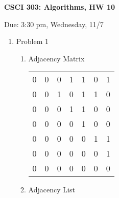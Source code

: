 \documentclass[11pt]{article}
\begin{document}
\begin{LARGE}
\centerline {\bf CSCI 303: Algorithms, HW 10}
\end{LARGE}
\vskip 0.25cm
\centerline{Due: 3:30 pm, Wednesday, 11/7}

\begin{enumerate}
\item Problem 1\\
\begin{enumerate}
\item Adjacency Matrix
\begin{tabular}{ccccccc}
0&0&0&1&1&0&1\\
0&0&1&0&1&1&0\\
0&0&0&1&1&0&0\\
0&0&0&0&1&0&0\\
0&0&0&0&0&1&1\\
0&0&0&0&0&0&1\\
0&0&0&0&0&0&0\\
\end{tabular}
\item Adjacency List
\begin{tabular}{c|ccccccc|}


\end{tabular}
\end{enumerate}
\end{enumerate}
\end{document}
